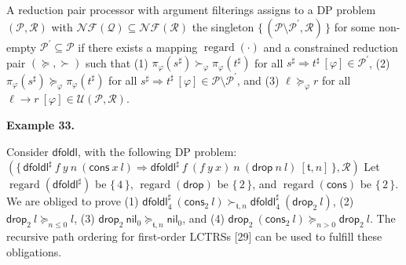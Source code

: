A reduction pair processor with argument filterings assigns to a DP problem $(\mathcal{P},\mathcal{R})$ with $\mathcal{N}\!\mathcal{F}(\mathcal{Q})\subseteq\mathcal{N}\!\mathcal{F}(\mathcal{R})$ the singleton $\{\,(\mathcal{P}\setminus\mathcal{P}^{\prime},\mathcal{R})\,\}$ for some non-empty $\mathcal{P}^{\prime}\subseteq\mathcal{P}$ if there exists a mapping $\operatorname{regard}(\cdot)$ and a constrained reduction pair $(\succeq,\succ)$ such that (1) ${\pi_{\varphi}(s^{\sharp})}\mathrel{\succ}_{\varphi}{\pi_{\varphi}(t^{\sharp})}$ for all ${s^{\sharp}}\Rightarrow{t^{\sharp}}\ [\varphi]\in\mathcal{P}^{\prime}$, (2) ${\pi_{\varphi}(s^{\sharp})}\mathrel{\succeq}_{\varphi}{\pi_{\varphi}(t^{\sharp})}$ for all ${s^{\sharp}}\Rightarrow{t^{\sharp}}\ [\varphi]\in\mathcal{P}\setminus\mathcal{P}^{\prime}$, and (3) ${\ell}\mathrel{\succeq}_{\varphi}{r}$ for all ${\ell}\rightarrow{r}\ [\varphi]\in\mathcal{U}(\mathcal{P},\mathcal{R})$.\par
 
 
 
 
\par\medskip\noindent\textbf{Example 33.}\par
 
 
Consider $\mathsf{dfoldl}$, with the following DP problem: $(\{\,{{{{{\mathsf{dfoldl}^{\sharp}}\ {f}}\ {y}}\ {n}}\ {({{\mathsf{cons}}\ {x}}\ {l})}}\Rightarrow{{{{{\mathsf{dfoldl}^{\sharp}}\ {f}}\ {({{f}\ {y}}\ {x})}}\ {n}}\ {({{\mathsf{drop}}\ {n}}\ {l})}}\ [\mathfrak{t},n]\,\},\mathcal{R})$ Let $\operatorname{regard}(\mathsf{dfoldl}^{\sharp})$ be $\{\,4\,\}$, $\operatorname{regard}(\mathsf{drop})$ be $\{\,2\,\}$, and $\operatorname{regard}(\mathsf{cons})$ be $\{\,2\,\}$. We are obliged to prove (1) ${{\mathsf{dfoldl}^{\sharp}_{4}}\ {({\mathsf{cons}_{2}}\ {l})}}\mathrel{\succ}_{\mathfrak{t},n}{{\mathsf{dfoldl}^{\sharp}_{4}}\ {({\mathsf{drop}_{2}}\ {l})}}$, (2) ${{\mathsf{drop}_{2}}\ {l}}\mathrel{\succeq}_{n\leq 0}{l}$, (3) ${{\mathsf{drop}_{2}}\ {\mathsf{nil}_{0}}}\mathrel{\succeq}_{\mathfrak{t},n}{\mathsf{nil}_{0}}$, and (4) ${{\mathsf{drop}_{2}}\ {({\mathsf{cons}_{2}}\ {l})}}\mathrel{\succeq}_{n>0}{{\mathsf{drop}_{2}}\ {l}}$. The recursive path ordering for first-order LCTRSs [29] can be used to fulfill these obligations.\par
 
 
